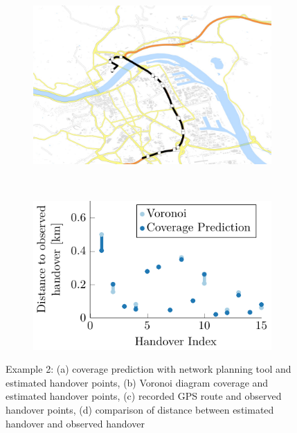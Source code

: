 \begin{figure}
	\begin{subfigure}[b]{0.5\linewidth}
			\includegraphics[width=\textwidth]{./images/1058_Handover}
			\caption{}
			\label{fig:1058_handover}
		\end{subfigure}%
		~
		\begin{subfigure}[b]{0.5\linewidth}


			\includegraphics[width=\textwidth]{./images/1058_predvorcomp}
			\caption{}
			\label{fig:1058_distcomp}
		\end{subfigure}

	\caption{Example 2: (a) coverage prediction with network planning tool and estimated handover points, (b) Voronoi diagram coverage and estimated handover points, (c) recorded GPS route and observed handover points, (d) comparison of distance between estimated handover and observed handover}\label{fig:1058overview}
\end{figure}

